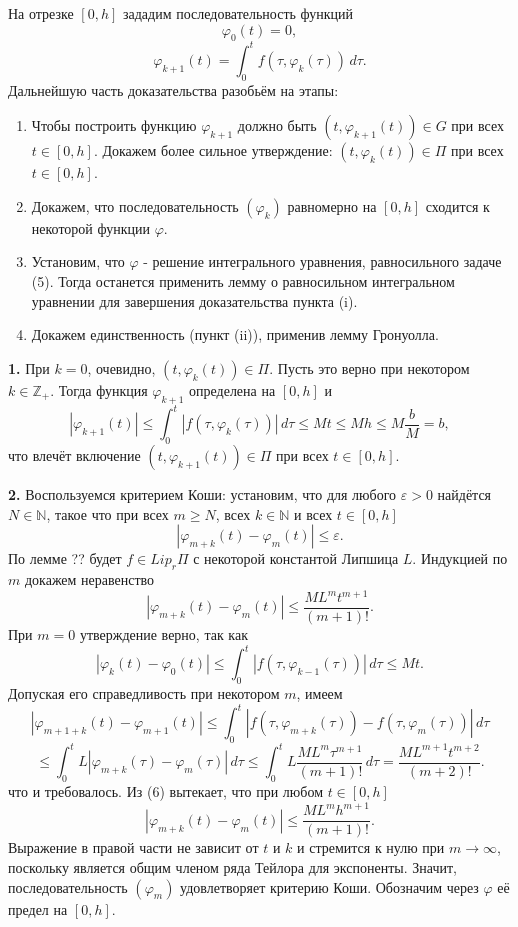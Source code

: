 На отрезке $[0, h]$ зададим последовательность функций
$$\varphi_0(t) = 0, $$
$$\varphi_{k+1}(t) = \int_{0}^{t} f(\tau, \varphi_k(\tau)) \, d\tau.$$
Дальнейшую часть доказательства разобьём на этапы:
\begin{enumerate}
    \item Чтобы построить функцию $\varphi_{k+1}$ должно быть $(t, \varphi_{k+1}(t)) \in G$ при всех $t \in [0, h]$. Докажем более сильное утверждение: $(t, \varphi_k(t)) \in \Pi$ при всех $t \in [0, h]$.
    \item Докажем, что последовательность $(\varphi_k)$ равномерно на $[0, h]$ сходится к некоторой функции $\varphi$.
    \item Установим, что $\varphi$ - решение интегрального уравнения, равносильного задаче (5). Тогда останется применить лемму о равносильном интегральном уравнении для завершения доказательства пункта (i).
    \item Докажем единственность (пункт (ii)), применив лемму Гронуолла.
\end{enumerate}

\textbf{1.} При $k=0$, очевидно, $(t, \varphi_k(t)) \in \Pi$. Пусть это верно при некотором $k \in \mathbb{Z}_{+}$. Тогда функция $\varphi_{k+1}$ определена на $[0, h]$ и
$$|\varphi_{k+1}(t)| \leq \int_{0}^{t} |f(\tau, \varphi_k(\tau))| \, d\tau \leq Mt \leq Mh \leq M \frac{b}{M} = b,$$
что влечёт включение $(t, \varphi_{k+1}(t)) \in \Pi$ при всех $t \in [0, h]$.

\textbf{2.} Воспользуемся критерием Коши: установим, что для любого $\varepsilon > 0$ найдётся $N \in \mathbb{N}$, такое что при всех $m \geq N$, всех $k \in \mathbb{N}$ и всех $t \in [0, h]$
$$|\varphi_{m+k}(t) - \varphi_m(t)| \leq \varepsilon.$$
По лемме ?? будет $f \in Lip_r \Pi$ с некоторой константой Липшица $L$. Индукцией по $m$ докажем неравенство
$$|\varphi_{m+k}(t) - \varphi_m(t)| \leq \frac{ML^m t^{m+1}}{(m+1)!}.$$
При $m=0$ утверждение верно, так как
$$|\varphi_k(t) - \varphi_0(t)| \leq \int_{0}^{t} |f(\tau, \varphi_{k-1}(\tau))| \, d\tau \leq Mt.$$
Допуская его справедливость при некотором $m$, имеем
$$|\varphi_{m+1+k}(t) - \varphi_{m+1}(t)| \leq \int_{0}^{t} |f(\tau, \varphi_{m+k}(\tau)) - f(\tau, \varphi_m(\tau))| \, d\tau$$
$$\leq \int_{0}^{t} L |\varphi_{m+k}(\tau) - \varphi_m(\tau)| \, d\tau 
\leq \int_{0}^{t} L \frac{ML^m \tau^{m+1}}{(m+1)!} \, d\tau = \frac{ML^{m+1}t^{m+2}}{(m+2)!}.$$
что и требовалось. Из (6) вытекает, что при любом $t \in [0, h]$
$$|\varphi_{m+k}(t) - \varphi_m(t)| \leq \frac{ML^m h^{m+1}}{(m+1)!}.$$
Выражение в правой части не зависит от $t$ и $k$ и стремится к нулю при $m \to \infty$, поскольку является общим членом ряда Тейлора для экспоненты. Значит, последовательность $(\varphi_m)$ удовлетворяет критерию Коши. Обозначим через $\varphi$ её предел на $[0, h]$.

